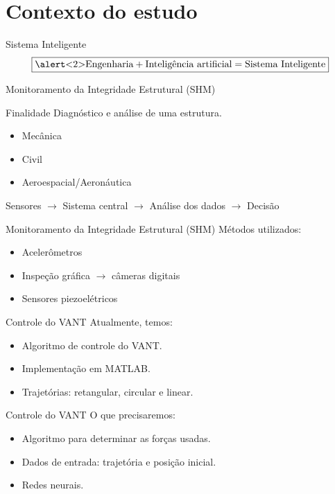 \section{Contexto do estudo}

\begin{frame}{Sistema Inteligente}
\[\boxed{\text{\alert<2>{Engenharia}} + \text{Inteligência artificial} = \text{Sistema Inteligente}}\]
\end{frame}
\begin{frame}{Monitoramento da Integridade Estrutural (SHM)}
\begin{block}{Finalidade}
    Diagnóstico e análise de uma estrutura.
\end{block} \pause

\begin{itemize}
    \item Mecânica
    \item Civil
    \item Aeroespacial/Aeronáutica
\end{itemize} \pause

Sensores \(\rightarrow\) Sistema central \(\rightarrow\) Análise dos dados \(\rightarrow\) Decisão
\end{frame}
\begin{frame}{Monitoramento da Integridade Estrutural (SHM)}
Métodos utilizados:
\begin{itemize}
    \item Acelerômetros
    \item Inspeção gráfica \(\rightarrow\) câmeras digitais
    \item \alert<2>{Sensores piezoelétricos}
\end{itemize}
\end{frame}
\begin{frame}{Controle do VANT}
\pause
Atualmente, temos:
\begin{itemize}
    \item Algoritmo de controle do VANT.
    \item Implementação em MATLAB.
    \item Trajetórias: retangular, circular e linear.
\end{itemize}\pause
\begin{figure}
    \centering
    
    \end{figure}
\end{frame}

\begin{frame}{Controle do VANT}
O que precisaremos:
\begin{itemize}
    \item Algoritmo para determinar as forças usadas.
    \item Dados de entrada: trajetória e posição inicial.
    \item Redes neurais.
\end{itemize} 

\begin{figure}
\centering

\end{figure}
\end{frame}